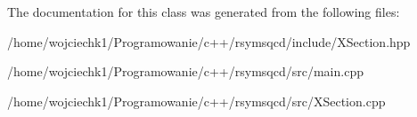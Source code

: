 The documentation for this class was generated from the following files\+:\begin{DoxyCompactItemize}
\item 
/home/wojciechk1/\+Programowanie/c++/rsymsqcd/include/X\+Section.\+hpp\item 
/home/wojciechk1/\+Programowanie/c++/rsymsqcd/src/main.\+cpp\item 
/home/wojciechk1/\+Programowanie/c++/rsymsqcd/src/X\+Section.\+cpp\end{DoxyCompactItemize}
